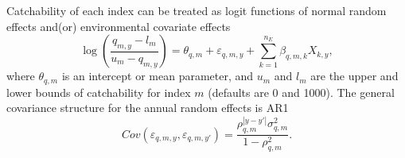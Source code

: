 \documentclass[
]{article}
\begin{document}
Catchability of each index can be treated as logit functions of normal random effects and(or) environmental covariate effects
\begin{equation*}
\log \left(\frac{q_{m,y}-l_m}{u_m-q_{m,y}}\right) = \theta_{q,m} + \varepsilon_{q,m,y}  + \sum^{n_E}_{k=1} \beta_{q,m,k} X_{k,y},
\end{equation*}
where \(\theta_{q,m}\) is an intercept or mean parameter, and \(u_{m}\) and \(l_{m}\) are the upper and lower bounds of catchability for index \(m\) (defaults are 0 and 1000). The general covariance structure for the annual random effects is AR1
\begin{equation*}
Cov\left(\varepsilon_{q,m,y},\varepsilon_{q,m,y'}\right) =   \frac{\rho_{q,m}^{|y-y'|}\sigma^2_{q,m}}{1 - \rho_{q,m}^2}.
\end{equation*}
\end{document}
